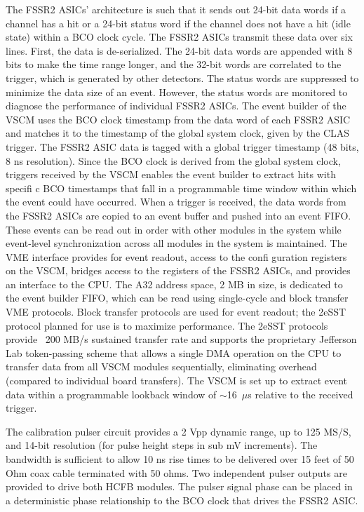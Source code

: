 The FSSR2 ASICs' architecture is such that it sends out 24-bit data words if a channel has a hit or a 24-bit status word if the channel does not have a hit (idle state) within a BCO clock cycle. The FSSR2 ASICs transmit these data over six lines. First, the data is de-serialized. The 24-bit data words are appended with 8 bits to make the time range longer, and the 32-bit words are correlated to the trigger, which is generated by other detectors. The status words are suppressed to minimize the data size of an event. However, the status words are monitored to diagnose the performance of individual FSSR2 ASICs. The event builder of the VSCM uses the BCO clock timestamp from the data word of each FSSR2 ASIC and matches it to the timestamp of the global system clock, given by the CLAS trigger. The FSSR2 ASIC data is tagged with a global trigger timestamp (48 bits, 8 ns resolution). Since the BCO clock is derived from the global system clock, triggers received by the VSCM enables the event builder to extract hits with specifi c BCO timestamps that fall in a programmable time window within which the event could have occurred. When a trigger is received, the data words from the FSSR2 ASICs are copied to an event buffer and pushed into an event FIFO. These events can be read out in order with other modules in the system while event-level synchronization across all modules in the system is maintained. The VME interface provides for event readout, access to the confi guration registers on the VSCM, bridges access to the registers of the FSSR2 ASICs, and provides an interface to the CPU. The A32 address space, 2 MB in size, is dedicated to the event builder FIFO, which can be read using single-cycle and block transfer VME protocols. Block transfer protocols are used for event readout; the 2eSST protocol planned for use is to maximize performance. The 2eSST protocols provide ~200 MB/s sustained transfer rate and supports the proprietary Jefferson Lab token-passing scheme that allows a single DMA operation on the CPU to transfer data from all VSCM modules sequentially, eliminating overhead (compared to individual board transfers). The VSCM is set up to extract event data within a programmable lookback window of $\sim$16~$\mu$s relative to the received trigger. 

The calibration pulser circuit provides a 2 Vpp dynamic range, up to 125 MS/S, and 14-bit resolution (for pulse height steps in sub mV increments). The bandwidth is sufficient to allow 10 ns rise times to be delivered over 15 feet of 50 Ohm coax cable terminated with 50 ohms. Two independent pulser outputs are provided to drive both HCFB modules. The pulser signal phase can be placed in a deterministic phase relationship to the BCO clock that drives the FSSR2 ASIC.

